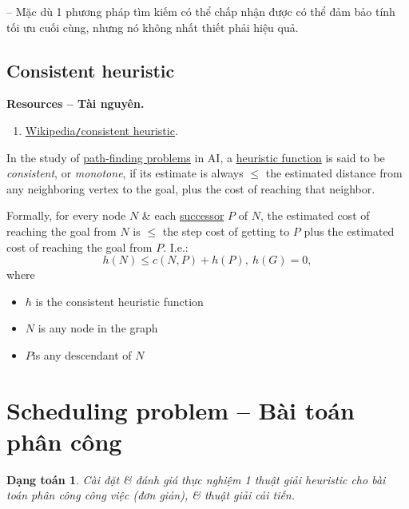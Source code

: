 \documentclass{article}
\newtheorem{dangtoan}{Dạng toán}
\begin{document}
-- Mặc dù 1 phương pháp tìm kiếm có thể chấp nhận được có thể đảm bảo tính tối ưu cuối cùng, nhưng nó không nhất thiết phải hiệu quả.


\subsection{Consistent heuristic}
\textbf{\textsf{Resources -- Tài nguyên.}}
\begin{enumerate}
	\item \href{https://en.wikipedia.org/wiki/Consistent_heuristic}{Wikipedia{\tt/}consistent heuristic}.
\end{enumerate}
In the study of \href{https://en.wikipedia.org/wiki/Shortest_path_problem}{path-finding problems} in AI, a \href{https://en.wikipedia.org/wiki/Heuristic_function}{heuristic function} is said to be {\it consistent}, or {\it monotone}, if its estimate is always $\le$ the estimated distance from any neighboring vertex to the goal, plus the cost of reaching that neighbor.

Formally, for every node $N$ \& each \href{https://en.wikipedia.org/wiki/Successor_(graph_theory)#Direction}{successor} $P$ of $N$, the estimated cost of reaching the goal from $N$ is $\le$ the step cost of getting to $P$ plus the estimated cost of reaching the goal from $P$. I.e.:
\begin{equation*}
	h(N)\le c(N,P) + h(P),\ h(G) = 0,
\end{equation*}
where
\begin{itemize}
	\item $h$ is the consistent heuristic function
	\item $N$ is any node in the graph
	\item $P$is any descendant of $N$
\end{itemize}


\section{Scheduling problem -- Bài toán phân công}

\begin{dangtoan}
	Cài đặt \& đánh giá thực nghiệm 1 thuật giải heuristic cho bài toán phân công công việc (đơn giản), \& thuật giải cải tiến.
\end{dangtoan}
\end{document}
